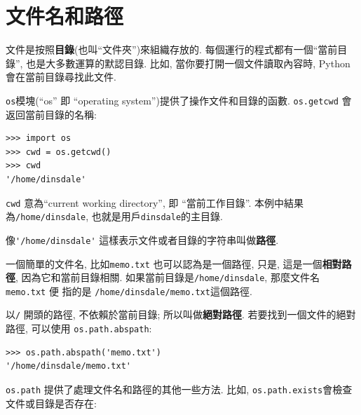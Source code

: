 \documentclass[10pt]{book}
\begin{document}



\section{文件名和路徑}
\label{paths}

文件是按照{\bf 目錄}(也叫``文件夾'')來組織存放的. 
每個運行的程式都有一個``當前目錄'', 也是大多數運算的默認目錄. 
比如, 當你要打開一個文件讀取內容時, Python會在當前目錄尋找此文件. 

{\tt os}模塊(``os'' 即 ``operating system'')提供了操作文件和目錄的函數. 
{\tt os.getcwd} 會返回當前目錄的名稱:

\begin{verbatim}
>>> import os
>>> cwd = os.getcwd()
>>> cwd
'/home/dinsdale'
\end{verbatim}
%
{\tt cwd} 意為``current working directory'', 即 ``當前工作目錄''. 
本例中結果為{\tt /home/dinsdale}, 也就是用戶{\tt dinsdale}的主目錄. 

像\verb"'/home/dinsdale'" 這樣表示文件或者目錄的字符串叫做{\bf 路徑}. 

一個簡單的文件名, 比如{\tt memo.txt} 也可以認為是一個路徑, 
只是, 這是一個{\bf 相對路徑}, 因為它和當前目錄相關. 
如果當前目錄是{\tt /home/dinsdale}, 那麼文件名{\tt memo.txt} 便
指的是 {\tt /home/dinsdale/memo.txt}這個路徑. 
 
 

以{\tt /} 開頭的路徑, 不依賴於當前目錄;
所以叫做{\bf 絕對路徑}.
若要找到一個文件的絕對路徑, 可以使用 {\tt os.path.abspath}:

\begin{verbatim}
>>> os.path.abspath('memo.txt')
'/home/dinsdale/memo.txt'
\end{verbatim}
%
{\tt os.path} 提供了處理文件名和路徑的其他一些方法. 
比如, {\tt os.path.exists}會檢查文件或目錄是否存在:
\end{document}
